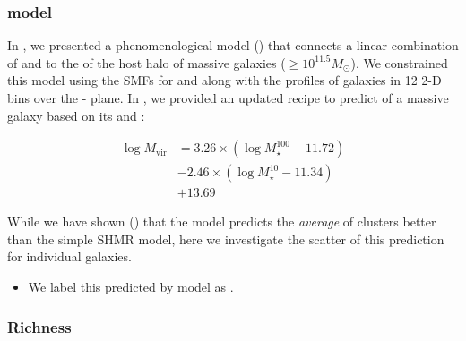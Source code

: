 \documentclass[fleqn,usenatbib,useAMS,english]{mnras}
\begin{document}
\subsubsection{\asap{} model}
    \label{sec:masap}

    In \citet{Huang2020}, we presented a phenomenological model (\asap{}) that connects a linear
    combination of  and  to the \mvir{} of the host halo of massive galaxies
    ($\geq 10^{11.5} M_{\odot}$).
    We constrained this model using the SMFs for  and  along with the
    \dsigma{} profiles of galaxies in 12 2-D bins over the - plane.
    In \citet{Ardila2021}, we provided an updated \asap{} recipe to predict \mvir{} of a
    massive galaxy based on its  and :

    \begin{equation}
        \begin{aligned}
        \log M_{\mathrm{vir}} &=3.26 \times\left(\log M_{\star}^{100}-11.72\right) \\
        &-2.46 \times\left(\log M_{\star}^{10}-11.34\right) \\
        &+13.69
        \end{aligned}
        \label{eq:asap}
    \end{equation}

    While we have shown (\citealt{Huang2020}) that the \asap{} model predicts the
    {\em average} \mvir{} of clusters
    better than the simple SHMR model, here we investigate the scatter of this
    prediction for individual galaxies.

    \begin{itemize}

        \item We label this \mvir{} predicted by \asap{} model as \masap{}.

    \end{itemize}

\subsubsection{Richness}
    \label{sec:proxy_richness}
\end{document}
